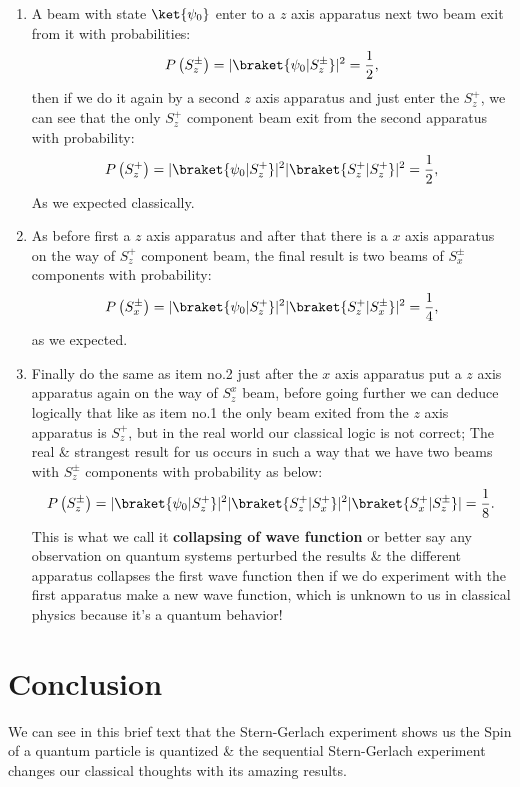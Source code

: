 \documentclass{article}
\begin{document}
\begin{enumerate}
    \item A beam with state $\ket{\psi_0}$ enter to a $z$ axis apparatus next two beam exit from it with probabilities:
    \begin{align}
P\left(S^{\pm}_{z}\right)=|\braket{\psi_0|S^{\pm}_{z}}|^2=\frac{1}{2},
    \end{align}
    then if we do it again by a second $z$ axis apparatus and just enter the $S^{+}_{z}$, we can see that the only $S^{+}_{z}$ component beam exit from the second apparatus with probability:
    \begin{equation}
        P\left(S^{+}_{z}\right)=|\braket{\psi_0|S^{+}_{z}}|^2|\braket{S^{+}_{z}|S^{+}_{z}}|^2=\frac{1}{2},
    \end{equation}
    As we expected classically.
    \item As before first a $z$ axis apparatus and after that there is a   $x$ axis apparatus on the way of $S^{+}_{z}$ component beam, the final result is two beams of $S^{\pm}_{x}$ components with probability:
    \begin{equation}
P\left(S^{\pm}_{x}\right)=|\braket{\psi_0|S^{+}_{z}}|^2|\braket{S^{+}_{z}|S^{\pm}_{x}}|^2=\frac{1}{4},
    \end{equation}
    as we expected.
    \item Finally do the same as item no.2 just after the $x$ axis apparatus put a $z$ axis apparatus again on the way of $S^{x}_{z}$ beam, before going further we can deduce logically that like as item no.1 the only beam exited from the $z$ axis apparatus is $S^{+}_{z}$, but in the real world our classical logic is not correct; The real \& strangest result for us occurs in such a way that we have two beams with $S^{\pm}_z$ components with probability as below:
    \begin{equation}
P\left(S^{\pm}_{z}\right)=|\braket{\psi_0|S^{+}_{z}}|^2|\braket{S^{+}_{z}|S^{+}_{x}}|^2|\braket{S^{+}_{x}|S^{\pm}_{z}}|=\frac{1}{8}.
    \end{equation}
    This is what we call it \textbf{collapsing of wave function} or better say any observation on quantum systems perturbed the results \& the different apparatus collapses the first wave function then if we do experiment with the first apparatus make a new wave function, which is unknown to us in classical physics because it's a quantum behavior!
\end{enumerate}

\section{Conclusion}
We can see in this brief text that the Stern-Gerlach experiment shows us the Spin of a quantum particle is quantized \& the sequential Stern-Gerlach experiment changes our classical thoughts with its amazing results.

  
  
\end{document}
